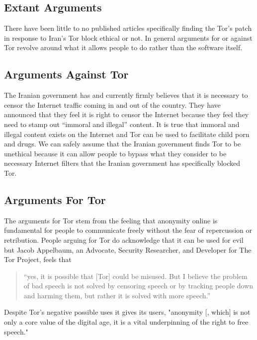 \documentclass[11pt]{article}
\begin{document}
\begin{multicols}{2}
\section{Extant Arguments} 

There have been little to no published articles specifically finding the Tor's
patch in response to Iran's Tor block ethical or not. In general arguments for
or against Tor revolve around what it allows people to do rather than the
software itself.

\subsection{Arguments Against Tor}

The Iranian government has and currently firmly believes that it is necessary to
censor the Internet traffic coming in and out of the country. They have
announced that they feel it is right to censor the Internet because they feel
they need to stamp out ``immoral and illegal''
content.\cite{CensorshipFearsRise} It is true that immoral and illegal content
exists on the Internet and Tor can be used to facilitate child porn and
drugs.\cite{Tor:ChildPorn, Tor:SilkRoad} We can safely assume that the Iranian
government finds Tor to be unethical because it can allow people to bypass what
they consider to be necessary Internet filters that the Iranian government has
specifically blocked Tor.\cite{IranBlocksTorSameDayFix}

\subsection{Arguments For Tor}

The arguments for Tor stem from the feeling that anonymity online is fundamental
for people to communicate freely without the fear of repercussion or
retribution.\cite{Tor:ArgumentForAppelbaum} People arguing for Tor do
acknowledge that it can be used for evil but Jacob Appelbaum, an Advocate,
Security Researcher, and Developer for The Tor Project, feels that
\begin{quotation} 
  
  ``yes, it is possible that [Tor] could be misused. But I believe the problem
  of bad speech is not solved by censoring speech or by tracking people down and
  harming them, but rather it is solved with more
  speech.''\cite{Tor:ArgumentForAppelbaum}

\end{quotation}
Despite Tor's negative possible uses it gives its users, 
"anonymity [, which] is not only a core value of the digital age, it is a vital
underpinning of the right to free speech."\cite{TorCreatesSaferInternet}


\end{multicols}
\end{document}
